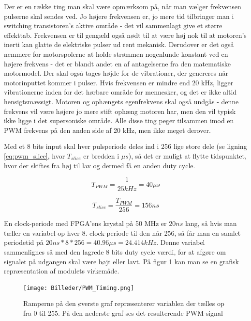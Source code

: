 Der er en række ting man skal være opmærksom på, når man vælger frekvensen pulserne skal sendes ved. Jo højere frekvensen er, jo mere tid tilbringer man i switching transistoren's aktive område - det vil sammenlagt give et større effekttab. Frekvensen er til gengæld også nødt til at være høj nok til at motoren's inerti kan glatte de elektriske pulser ud rent mekanisk. Derudover er det også nemmere for motorspolerne at holde strømmen nogenlunde konstant ved en højere frekvens - det er blandt andet en af antagelserne fra den matematiske motormodel. Der skal også tages højde for de vibrationer, der genereres når motorinputtet kommer i pulser. Hvis frekvensen er mindre end 20 kHz, ligger vibrationerne inden for det hørbare område for mennesker, og det er ikke altid hensigtsmæssigt. Motoren og ophængets egenfrekvens skal også undgås - denne frekvens vil være højere jo mere stift ophæng motoren har, men den vil typisk ikke ligge i det supersoniske område. Alle disse ting peger tilsammen imod en PWM frekvens på den anden side af 20 kHz, men ikke meget derover. 

Med et 8 bits input skal hver pulsperiode deles ind i 256 lige store dele (se ligning \ref{eq:pwm_slice}, hvor $T_{slice}$ er bredden i $\mu s$), så det er muligt at flytte tidspunktet, hvor der skiftes fra høj til lav og dermed få en anden duty cycle. 

\begin{equation}\label{eq:pwm_period}
T_{PWM}=\dfrac{1}{25 kHz} = 40 \mu s
\end{equation}

\begin{equation}\label{eq:pwm_slice}
T_{slice}=\dfrac{T_{PWM}}{256}=156ns
\end{equation}

En clock-periode med FPGA'ens krystal på 50 MHz er $20ns$ lang, så hvis man tæller en variabel op hver 8. clock-periode til den når 256, så får man en samlet periodetid på $20ns*8*256=40.96 \mu s=24.414kHz$. Denne variabel sammenlignes så med den lagrede 8 bits duty cycle værdi, for at afgøre om signalet på udgangen skal være højt eller lavt. På figur \ref{fig:PWM_timing} kan man se en grafisk repræsentation af modulets virkemåde.

\begin{figure}[ht]
	\begin{center}
		\texttt{[image: Billeder/PWM\_Timing.png]}
	\end{center}
\caption{Ramperne på den øverste graf repræsenterer variablen der tælles op fra 0 til 255. På den nederste graf ses det resulterende PWM-signal}
\label{fig:PWM_timing}
\end{figure}

